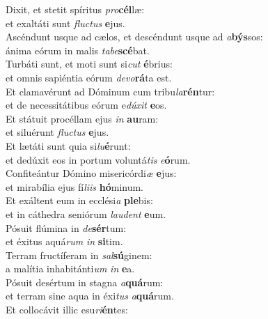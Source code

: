 \oddverse Dixit, et stetit spíritus \textit{pro}\textbf{cél}læ:~\*\\
\oddverse et exaltáti sunt \textit{flu}\textit{ctus} \textbf{e}jus.\\
\evenverse Ascéndunt usque ad cælos, et descéndunt usque ad \textit{a}\textbf{býs}sos:~\*\\
\evenverse ánima eórum in malis \textit{ta}\textit{be}\textbf{scé}bat.\\
\oddverse Turbáti sunt, et moti sunt si\textit{cut} \textbf{é}brius:~\*\\
\oddverse et omnis sapiéntia eórum \textit{de}\textit{vo}\textbf{rá}ta est.\\
\evenverse Et clamavérunt ad Dóminum cum tribu\textit{la}\textbf{rén}tur:~\*\\
\evenverse et de necessitátibus eórum e\textit{dú}\textit{xit} \textbf{e}os.\\
\oddverse Et státuit procéllam ejus \textit{in} \textbf{au}ram:~\*\\
\oddverse et siluérunt \textit{flu}\textit{ctus} \textbf{e}jus.\\
\evenverse Et lætáti sunt quia si\textit{lu}\textbf{é}runt:~\*\\
\evenverse et dedúxit eos in portum voluntá\textit{tis} \textit{e}\textbf{ó}rum.\\
\oddverse Confiteántur Dómino misericórdi\textit{æ} \textbf{e}jus:~\*\\
\oddverse et mirabília ejus fí\textit{li}\textit{is} \textbf{hó}minum.\\
\evenverse Et exáltent eum in ecclési\textit{a} \textbf{ple}bis:~\*\\
\evenverse et in cáthedra seniórum \textit{lau}\textit{dent} \textbf{e}um.\\
\oddverse Pósuit flúmina in \textit{de}\textbf{sér}tum:~\*\\
\oddverse et éxitus aquá\textit{rum} \textit{in} \textbf{si}tim.\\
\evenverse Terram fructíferam in \textit{sal}\textbf{sú}ginem:~\*\\
\evenverse a malítia inhabitánti\textit{um} \textit{in} \textbf{e}a.\\
\oddverse Pósuit desértum in stagna \textit{a}\textbf{quá}rum:~\*\\
\oddverse et terram sine aqua in éxi\textit{tus} \textit{a}\textbf{quá}rum.\\
\evenverse Et collocávit illic esu\textit{ri}\textbf{én}tes:~\*\\
